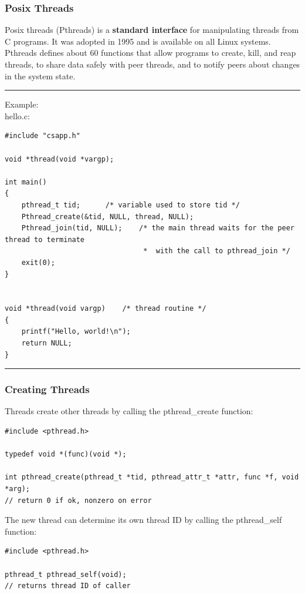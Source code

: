 \documentclass[11pt]{article}
\begin{document}
\subsubsection{Posix Threads}
\label{sec:org075c331}
Posix threads (Pthreads) is a \textbf{standard interface} for manipulating threads from C programs. It was adopted in 1995 and is available on all Linux systems. Pthreads defines about 60 functions that allow programs to create, kill, and reap threads, to share data safely with peer threads, and to notify peers about changes in the system state.\\


\noindent\rule{\textwidth}{0.5pt}
Example:\\
hello.c:\\
\begin{verbatim}
#include "csapp.h"

void *thread(void *vargp);

int main()
{
    pthread_t tid;		/* variable used to store tid */
    Pthread_create(&tid, NULL, thread, NULL);
    Pthread_join(tid, NULL);	/* the main thread waits for the peer thread to terminate
                                 *  with the call to pthread_join */
    exit(0);
}


void *thread(void vargp)	/* thread routine */
{
    printf("Hello, world!\n");
    return NULL;
}

\end{verbatim}

\noindent\rule{\textwidth}{0.5pt}


\subsubsection{Creating Threads}
\label{sec:org4fcb795}
Threads create other threads by calling the pthread\_create function:\\
\begin{verbatim}
#include <pthread.h>

typedef void *(func)(void *);

int pthread_create(pthread_t *tid, pthread_attr_t *attr, func *f, void *arg);
// return 0 if ok, nonzero on error
\end{verbatim}


The new thread can determine its own thread ID by calling the pthread\_self function:\\
\begin{verbatim}
#include <pthread.h>

pthread_t pthread_self(void);
// returns thread ID of caller
\end{verbatim}
\end{document}
